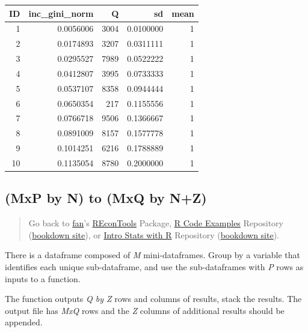 \documentclass[
]{book}
\begin{document}
\begin{table}[!h]
\centering
\begin{tabular}{r|r|r|r|r}
\hline
ID & inc\_gini\_norm & Q & sd & mean\\
\hline
\rowcolor{gray!6}  1 & 0.0056006 & 3004 & 0.0100000 & 1\\
\hline
2 & 0.0174893 & 3207 & 0.0311111 & 1\\
\hline
\rowcolor{gray!6}  3 & 0.0295527 & 7989 & 0.0522222 & 1\\
\hline
4 & 0.0412807 & 3995 & 0.0733333 & 1\\
\hline
\rowcolor{gray!6}  5 & 0.0537107 & 8358 & 0.0944444 & 1\\
\hline
6 & 0.0650354 & 217 & 0.1155556 & 1\\
\hline
\rowcolor{gray!6}  7 & 0.0766718 & 9506 & 0.1366667 & 1\\
\hline
8 & 0.0891009 & 8157 & 0.1577778 & 1\\
\hline
\rowcolor{gray!6}  9 & 0.1014251 & 6216 & 0.1788889 & 1\\
\hline
10 & 0.1135054 & 8780 & 0.2000000 & 1\\
\hline
\end{tabular}
\end{table}

\hypertarget{mxp-by-n-to-mxq-by-nz}{%
\subsection{(MxP by N) to (MxQ by N+Z)}\label{mxp-by-n-to-mxq-by-nz}}

\begin{quote}
Go back to \href{http://fanwangecon.github.io/}{fan}'s \href{https://fanwangecon.github.io/REconTools/}{REconTools} Package, \href{https://fanwangecon.github.io/R4Econ/}{R Code Examples} Repository (\href{https://fanwangecon.github.io/R4Econ/bookdown}{bookdown site}), or \href{https://fanwangecon.github.io/Stat4Econ/}{Intro Stats with R} Repository (\href{https://fanwangecon.github.io/Stat4Econ/bookdown}{bookdown site}).
\end{quote}

There is a dataframe composed of \emph{M} mini-dataframes. Group by a variable that identifies each unique sub-dataframe, and use the sub-dataframes with \emph{P} rows as inputs to a function.

The function outputs \emph{Q by Z} rows and columns of results, stack the results. The output file has \emph{MxQ} rows and the \emph{Z} columns of additional results should be appended.
\end{document}
